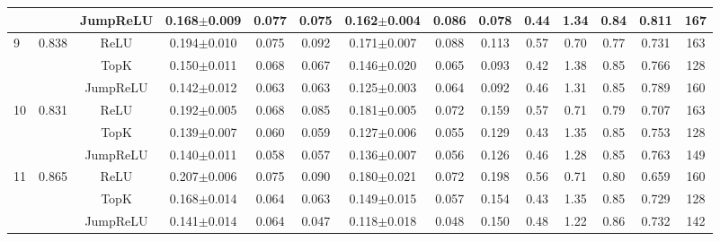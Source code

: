 \begin{table}[t]
\begin{adjustbox}{max width=\linewidth}
\begin{tabular}{llcccccccccccc}
 &  & JumpReLU & 0.168$\pm$0.009 & 0.077 & 0.075 & 0.162$\pm$0.004 & 0.086 & 0.078 & 0.44 & 1.34 & 0.84 & 0.811 & 167 \\
\midrule
9 & 0.838 & ReLU & 0.194$\pm$0.010 & 0.075 & 0.092 & 0.171$\pm$0.007 & 0.088 & 0.113 & 0.57 & 0.70 & 0.77 & 0.731 & 163 \\
 &  & TopK & 0.150$\pm$0.011 & 0.068 & 0.067 & 0.146$\pm$0.020 & 0.065 & 0.093 & 0.42 & 1.38 & 0.85 & 0.766 & 128 \\
 &  & JumpReLU & 0.142$\pm$0.012 & 0.063 & 0.063 & 0.125$\pm$0.003 & 0.064 & 0.092 & 0.46 & 1.31 & 0.85 & 0.789 & 160 \\
\midrule
10 & 0.831 & ReLU & 0.192$\pm$0.005 & 0.068 & 0.085 & 0.181$\pm$0.005 & 0.072 & 0.159 & 0.57 & 0.71 & 0.79 & 0.707 & 163 \\
 &  & TopK & 0.139$\pm$0.007 & 0.060 & 0.059 & 0.127$\pm$0.006 & 0.055 & 0.129 & 0.43 & 1.35 & 0.85 & 0.753 & 128 \\
 &  & JumpReLU & 0.140$\pm$0.011 & 0.058 & 0.057 & 0.136$\pm$0.007 & 0.056 & 0.126 & 0.46 & 1.28 & 0.85 & 0.763 & 149 \\
\midrule
11 & 0.865 & ReLU & 0.207$\pm$0.006 & 0.075 & 0.090 & 0.180$\pm$0.021 & 0.072 & 0.198 & 0.56 & 0.71 & 0.80 & 0.659 & 160 \\
 &  & TopK & 0.168$\pm$0.014 & 0.064 & 0.063 & 0.149$\pm$0.015 & 0.057 & 0.154 & 0.43 & 1.35 & 0.85 & 0.729 & 128 \\
 &  & JumpReLU & 0.141$\pm$0.014 & 0.064 & 0.047 & 0.118$\pm$0.018 & 0.048 & 0.150 & 0.48 & 1.22 & 0.86 & 0.732 & 142 \\
\bottomrule
\end{tabular}
\end{adjustbox}
\end{table}
